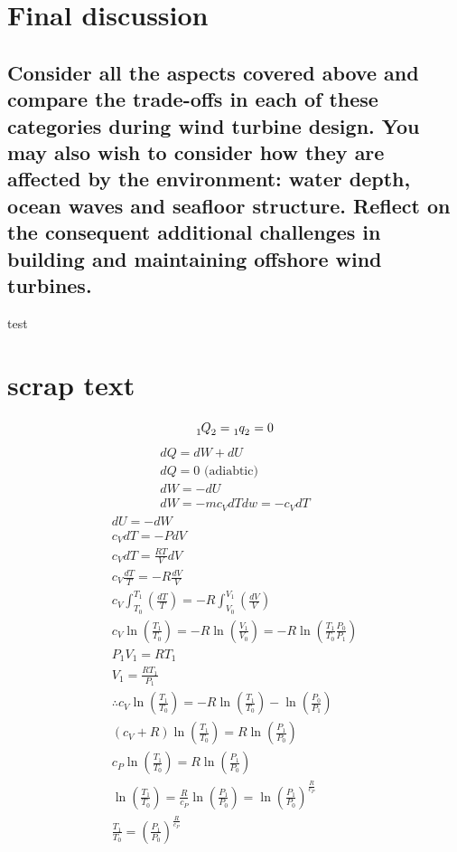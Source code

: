 \documentclass[12pt]{article}
\numberwithin{equation}{section}
\begin{document}
\begin{flushleft}
\section{Final discussion}
\subsection{Consider all the aspects covered above and compare the trade-offs in each of these categories during wind turbine design. You may also wish to consider how they are affected by the environment: water depth, ocean waves and seafloor structure. Reflect on the consequent additional challenges in building and maintaining offshore wind turbines.}
test

\section{scrap text}
\begin{equation}
  \tensor[_1]{Q}{_2} = \tensor[_1]{q}{_2} = 0
\end{equation}
\begin{gather}
  dQ = dW + dU\\
  dQ = 0 \textrm{ (adiabtic)}\\
  dW = - dU\\
  dW = -m c_V dT
  dw = - c_V dT 
\end{gather}
\begin{gather}
  dU = -dW\\
  c_V dT = -PdV\\
  c_V dT = \frac{RT}{V} dV\\
  c_V \frac{dT}{T} = -R \frac{dV}{V}\\
  c_V\int_{T_0}^{T_1} \left( \frac{dT}{T} \right) = -R \int_{V_0}^{V_1} \left( \frac{dV}{V} \right)\\
  c_V \ln \left( \frac{T_1}{T_0} \right) = -R \ln \left( \frac{V_1}{V_0} \right) = - R \ln \left(\frac{T_1}{T_0} \frac{P_0}{P_1}\right)\\
  P_1 V_1 = R T_1\\
  V_1 = \frac{RT_1}{P_1}\\
  \therefore c_V \ln \left( \frac{T_1}{T_0} \right) = -R \ln \left(\frac{T_1}{T_0} \right) - \ln \left(\frac{P_0}{P_1}\right)\\
  (c_V + R) \ln \left(\frac{T_1}{T_0} \right) = R \ln \left(\frac{P_1}{P_0}\right)\\
  c_P \ln \left(\frac{T_1}{T_0} \right) = R \ln \left(\frac{P_1}{P_0}\right)\\
  \ln \left(\frac{T_1}{T_0} \right) = \frac{R}{c_P}\ln \left(\frac{P_1}{P_0}\right) = \ln \left(\frac{P_1}{P_0}\right)^{\frac{R}{c_P}}\\
  \frac{T_1}{T_0} = \left( \frac{P_1}{P_0} \right)^{\frac{R}{c_P}}
\end{gather}


\end{flushleft}
\end{document}
